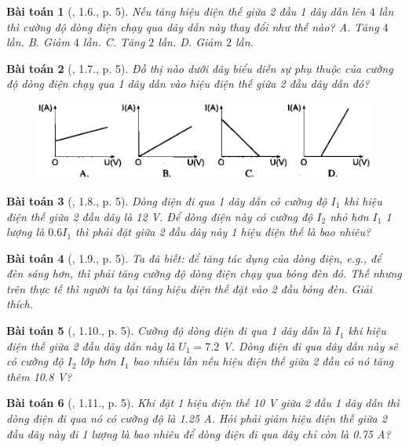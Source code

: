 \documentclass{article}
\newtheorem{baitoan}{Bài toán}
\begin{document}
\begin{baitoan}[\cite{SBT_Vat_Ly_9}, 1.6., p. 5]
	Nếu tăng hiệu điện thế giữa 2 đầu 1 dây dẫn lên $4$ lần thì cường độ dòng điện chạy qua dây dẫn này thay đổi như thế nào? {\sf A.} Tăng $4$ lần. {\sf B.} Giảm $4$ lần. {\sf C.} Tăng $2$ lần. {\sf D.} Giảm $2$ lần.
\end{baitoan}

\begin{baitoan}[\cite{SBT_Vat_Ly_9}, 1.7., p. 5]
	Đồ thị nào dưới đây biểu diễn sự phụ thuộc của cường độ dòng điện chạy qua 1 dây dẫn vào hiệu điện thế giữa 2 đầu dây dẫn đó?
	\begin{figure}[H]
		\centering
		\includegraphics[scale=0.25]{SBT_1.1}
	\end{figure}
\end{baitoan}

\begin{baitoan}[\cite{SBT_Vat_Ly_9}, 1.8., p. 5]
	Dòng điện đi qua 1 dây dẫn có cường độ $I_1$ khi hiệu điện thế giữa 2 đầu dây là \emph{12 V}. Để dòng điện này có cường độ $I_2$ nhỏ hơn $I_1$ 1 lượng là $0.6I_1$ thì phải đặt giữa 2 đầu dây này 1 hiệu điện thế là bao nhiêu?
\end{baitoan}

\begin{baitoan}[\cite{SBT_Vat_Ly_9}, 1.9., p. 5]
	Ta đã biết: để tăng tác dụng của dòng điện, e.g., để đèn sáng hơn, thì phải tăng cường độ dòng điện chạy qua bóng đèn đó. Thế nhưng trên thực tế thì người ta lại tăng hiệu điện thế đặt vào 2 đầu bóng đèn. Giải thích.
\end{baitoan}

\begin{baitoan}[\cite{SBT_Vat_Ly_9}, 1.10., p. 5]
	Cường độ dòng điện đi qua 1 dây dẫn là $I_1$ khi hiệu điện thế giữa 2 đầu dây dẫn này là $U_1 = 7.2$ \emph{V}. Dòng điện đi qua dây dẫn này sẽ có cường độ $I_2$ lớp hơn $I_1$ bao nhiêu lần nếu hiệu điện thế giữa 2 đầu có nó tăng thêm \emph{10.8 V}?
\end{baitoan}

\begin{baitoan}[\cite{SBT_Vat_Ly_9}, 1.11., p. 5]
	Khi đặt 1 hiệu điện thế \emph{10 V} giữa 2 đầu 1 dây dẫn thì dòng điện đi qua nó có cường độ là \emph{1.25 A}. Hỏi phải giảm hiệu điện thế giữa 2 đầu dây này đi 1 lượng là bao nhiêu để dòng điện đi qua dây chỉ còn là \emph{0.75 A}?
\end{baitoan}
\end{document}
